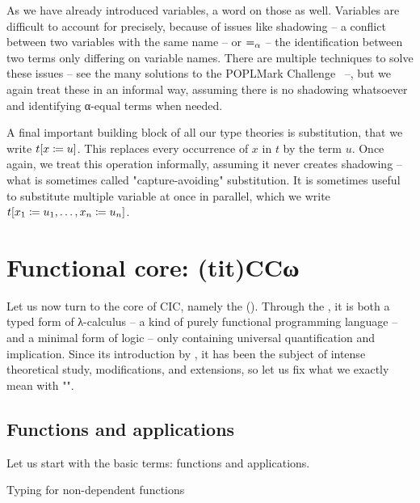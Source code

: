 \AP As we have already introduced variables, a word on those as well. Variables are difficult
to account for precisely, because of issues like shadowing – a conflict between two variables
with the same name – or  $=_{\alpha}$ – the identification between two terms
only differing on variable names. There are multiple techniques to solve these issues
– see the many solutions to the POPLMark Challenge~ –, 
but we again treat these in an informal way, assuming
there is no shadowing whatsoever and identifying α-equal terms when needed.%

A final important building block of all our type theories is substitution,
that we write $t[x \coloneqq u]$. This replaces every occurrence of $x$ in $t$ by the term
$u$. Once again, we treat this operation informally, assuming it never creates
shadowing – what is sometimes called "capture-avoiding" substitution.
It is sometimes useful to substitute multiple variable at once in parallel,
which we write $t[x_1 \coloneqq u_1, \dots, x_n \coloneqq u_n]$.

\section{Functional core: \kl(tit){CCω}}
\label{sec:tech-ccw}

\AP Let us now turn to the core of CIC, namely the
 (). Through the ,
it is both a typed form of λ-calculus – \ie a kind of purely functional
programming language – and a minimal form
of logic – only containing universal quantification and implication.
Since its introduction by , it has been the subject of intense
theoretical study, modifications, and extensions, so let us fix what we exactly mean
with "".

\subsection{Functions and applications}

Let us start with the basic terms: functions and applications.

\begin{marginfigure}
  \caption{Typing for non-dependent functions}
  \label{fig:cic-nondep-fun}
\end{marginfigure}

